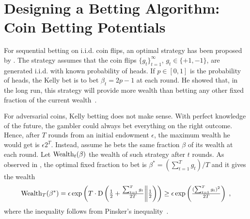 \section{Designing a Betting Algorithm: Coin Betting Potentials}
\label{section:coin-betting-potentials}


For sequential betting on i.i.d. coin flips, an optimal strategy has been
proposed by \citet{Kelly-1956}.  The strategy assumes that the coin flips
$\{g_t\}_{t=1}^\infty$, $g_t \in \{+1,-1\}$, are generated i.i.d. with known
probability of heads. If $p \in [0,1]$ is the probability of heads, the Kelly
bet is to bet $\beta_t = 2p - 1$ at each round. He showed that, in the long
run, this strategy will provide more wealth than betting any other fixed
fraction of the current wealth~\cite{Kelly-1956}.

For adversarial coins, Kelly betting does not make sense. With perfect
knowledge of the future, the gambler could always bet everything on the right
outcome.  Hence, after $T$ rounds from an initial endowment $\epsilon$, the
maximum wealth he would get is $\epsilon 2^T$.  Instead, assume he bets the
same fraction $\beta$ of its wealth at each round.  Let $\operatorname{Wealth}_t(\beta)$ the
wealth of such strategy after $t$ rounds.  As observed in
\cite{McMahan-Abernethy-2013}, the optimal fixed fraction to bet is
$\beta^*=(\sum_{t=1}^T g_t)/T$ and it gives the wealth
\begin{equation}
\label{eq:opt_wealth}
\operatorname{Wealth}_T(\beta^*)
= \epsilon \exp\left(T \cdot \operatorname{D}\left({\tfrac{1}{2}+\tfrac{\sum_{t=1}^T g_t}{2T}}\middle\|{\tfrac{1}{2}}\right)\right)
\ge \epsilon \exp\left(\tfrac{(\sum_{t=1}^T g_t)^2}{2 T}\right) \; ,
\end{equation}
where the inequality follows from Pinsker's inequality~\citep[Lemma
11.6.1]{Cover-Thomas-2006}.

